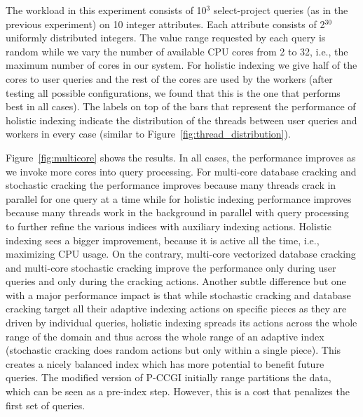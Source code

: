 The workload in this experiment consists of 10$^{3}$ select-project queries (as in the previous experiment) on 10 integer attributes.
Each attribute consists of 2$^{30}$ uniformly distributed integers.
The value range requested by each query is random while we vary
the number of available CPU cores from 2 to 32, i.e., the maximum number of cores in our system.
For holistic indexing we give half of the cores to user queries  and the rest of the cores are used by the workers (after testing all possible configurations, we found that this is the one that performs best in all cases).
The labels on top of the bars that represent the performance of holistic indexing indicate the distribution of the threads between user queries and workers in every case
(similar to Figure~\ref{fig:thread_distribution}).




Figure~\ref{fig:multicore} shows the results.
In all cases, the performance improves as we invoke more cores into query processing.
For multi-core database cracking and stochastic cracking the performance improves because many threads crack in parallel for one query at a time
while for holistic indexing performance improves because many threads work in the background in parallel with query processing
to further refine the various indices with auxiliary indexing actions.
Holistic indexing sees a bigger improvement, because it is active all the time, i.e., maximizing CPU usage.%
 On the contrary, multi-core vectorized database cracking and multi-core stochastic cracking improve the performance only during user queries and only during the cracking actions.
Another subtle difference but one with a major performance impact is that while stochastic cracking and database cracking target all their adaptive indexing
 actions on specific pieces as they are driven by individual queries, holistic indexing spreads its actions across the whole range of the
domain and thus across the whole range of an adaptive index (stochastic cracking does random actions but only within a single piece). 
This creates a nicely balanced index which has more potential to benefit future queries.
The modified version of P-CCGI initially range partitions the data, which can be seen as a pre-index step. 
However, this is a cost that penalizes the first set of queries.


